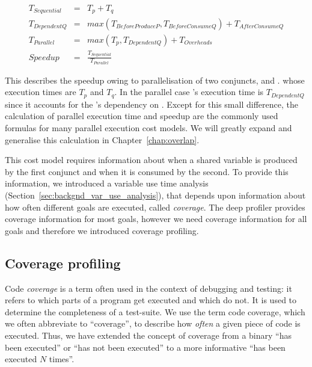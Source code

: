 
\begin{eqnarray*}
T_{Sequential} & = & T_p + T_q \\
T_{DependentQ} & = & max(T_{BeforeProduceP}, T_{BeforeConsumeQ}) +
T_{AfterConsumeQ} \\
T_{Parallel} & = & max(T_p, T_{DependentQ}) + T_{Overheads} \\
Speedup & = & \frac{T_{Sequential}}{T_{Parallel}}
\end{eqnarray*}

This describes the speedup owing to parallelisation of two conjuncts,
and .
whose execution times are $T_p$ and $T_q$.
In the parallel case 's execution time is $T_{DependentQ}$ since it
accounts for the 's dependency on .
Except for this small difference,
the calculation of parallel execution time and speedup are the commonly
used formulas for many parallel execution cost models.
We will greatly expand and generalise this calculation in
Chapter~\ref{chap:overlap}.

This cost model requires information about when a shared variable is
produced by the first conjunct and when it is consumed by the second.
To provide this information,
we introduced a variable use time analysis
(Section~\ref{sec:backgnd_var_use_analysis}),
that depends upon information about how often different goals are executed,
called \emph{coverage}.
The deep profiler provides coverage information for most goals,
however we need coverage information for all goals
and therefore we introduced coverage profiling.

\subsection{Coverage profiling}
\label{sec:backgnd_coverage}


Code \emph{coverage} is a term often used in the context of debugging and
testing:
it refers to which parts of a program get executed and which do not.
It is used to determine the completeness of a test-suite.
We use the term code coverage,
which we often abbreviate to ``coverage'',
to describe how \emph{often} a given piece of code is executed.
Thus, we have extended the concept of coverage from a binary ``has been
executed'' or ``has not been executed'' to a more informative
``has been executed $N$ times''.

